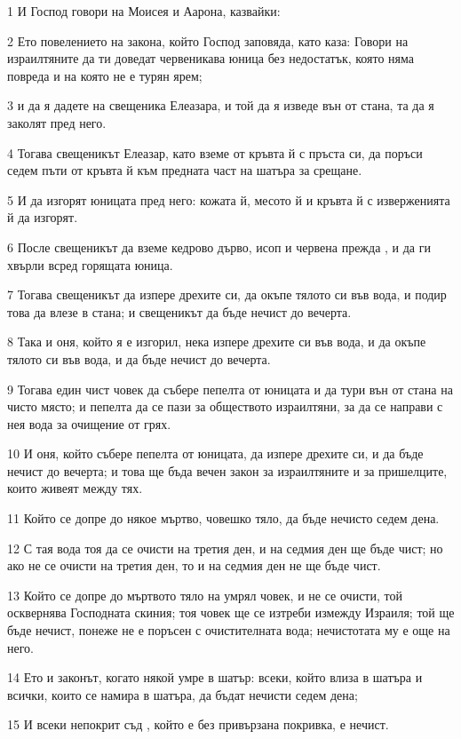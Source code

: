 \par 1 И Господ говори на Моисея и Аарона, казвайки:
\par 2 Ето повелението на закона, който Господ заповяда, като каза: Говори на израилтяните да ти доведат червеникава юница без недостатък, която няма повреда и на която не е турян ярем;
\par 3 и да я дадете на свещеника Елеазара, и той да я изведе вън от стана, та да я заколят пред него.
\par 4 Тогава свещеникът Елеазар, като вземе от кръвта й с пръста си, да поръси седем пъти от кръвта й към предната част на шатъра за срещане.
\par 5 И да изгорят юницата пред него: кожата й, месото й и кръвта й с изверженията й да изгорят.
\par 6 После свещеникът да вземе кедрово дърво, исоп и червена прежда , и да ги хвърли всред горящата юница.
\par 7 Тогава свещеникът да изпере дрехите си, да окъпе тялото си във вода, и подир това да влезе в стана; и свещеникът да бъде нечист до вечерта.
\par 8 Така и оня, който я е изгорил, нека изпере дрехите си във вода, и да окъпе тялото си във вода, и да бъде нечист до вечерта.
\par 9 Тогава един чист човек да събере пепелта от юницата и да тури вън от стана на чисто място; и пепелта да се пази за обществото израилтяни, за да се направи с нея вода за очищение от грях.
\par 10 И оня, който събере пепелта от юницата, да изпере дрехите си, и да бъде нечист до вечерта; и това ще бъда вечен закон за израилтяните и за пришелците, които живеят между тях.
\par 11 Който се допре до някое мъртво, човешко тяло, да бъде нечисто седем дена.
\par 12 С тая вода тоя да се очисти на третия ден, и на седмия ден ще бъде чист; но ако не се очисти на третия ден, то и на седмия ден не ще бъде чист.
\par 13 Който се допре до мъртвото тяло на умрял човек, и не се очисти, той осквернява Господната скиния; тоя човек ще се изтреби измежду Израиля; той ще бъде нечист, понеже не е поръсен с очистителната вода; нечистотата му е още на него.
\par 14 Ето и законът, когато някой умре в шатър: всеки, който влиза в шатъра и всички, които се намира в шатъра, да бъдат нечисти седем дена;
\par 15 И всеки непокрит съд , който е без привързана покривка, е нечист.
